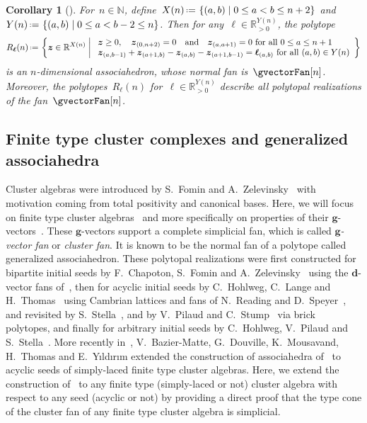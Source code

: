\documentclass{amsart}
\newtheorem{corollary}[theorem]{Corollary}
\theoremstyle{definition}
\newcommand{\R}{\mathbb{R}} %
\newcommand{\N}{\mathbb{N}} %
\renewcommand{\b}[1]{{\boldsymbol{#1}}} %
\newcommand{\set}[2]{\left\{ #1 \;\middle|\; #2 \right\}} %
\newcommand{\eqdef}{\mbox{\,\raisebox{0.2ex}{\scriptsize\ensuremath{\mathrm:}}\ensuremath{=}\,}} %
\newcommand{\darkblue}{\color{darkblue}} %
\newcommand{\defn}[1]{\textsl{\darkblue #1}} %
\newcommand{\vincent}[1]{\todo[color=blue!30]{#1 \\ \hfill --- V.}}
\begin{document}
\begin{corollary}[{\cite[Sect.~3.2]{ArkaniHamedBaiHeYan}}]
\label{coro:allPolytopalRealizationsAsso}
For~$n \in \N$, define~$X(n) \eqdef \set{(a,b)}{0 \le a < b \le n+2}$ and~$Y(n) \eqdef \set{(a,b)}{0 \le a < b-2 \le n}$.
Then for any~$\b{\ell} \in \R_{>0}^{Y(n)}$, the polytope
\[
R_\b{\ell}(n) \eqdef \set{\b{z} \in \R^{X(n)}}{\begin{array}{l} \b{z} \ge 0, \quad \b{z}_{(0,n+2)} = 0 \quad\text{and}\quad \b{z}_{(a,a+1)} = 0 \text{ for all } 0 \le a \le n+1 \\ \b{z}_{(a,b-1)} + \b{z}_{(a+1,b)} - \b{z}_{(a,b)} - \b{z}_{(a+1,b-1)} = \b{\ell}_{(a,b)} \text{ for all } (a,b) \in Y(n) \end{array}}
\]
is an $n$-dimensional associahedron, whose normal fan is~$\gvectorFan[n]$.
Moreover, the polytopes~$R_\b{\ell}(n)$ for~$\b{\ell} \in \R_{>0}^{Y(n)}$ describe all polytopal realizations of the fan~$\gvectorFan[n]$.
\end{corollary}



\subsection{Finite type cluster complexes and generalized associahedra}
\label{subsec:typeConeCA}

Cluster algebras were introduced by S.~Fomin and A.~Zelevinsky~\cite{FominZelevinsky-ClusterAlgebrasI} with motivation coming from total positivity and canonical bases.
Here, we will focus on finite type cluster algebras~\cite{FominZelevinsky-ClusterAlgebrasII} and more specifically on properties of their $\b{g}$-vectors~\cite{FominZelevinsky-ClusterAlgebrasIV}.
These $\b{g}$-vectors support a complete simplicial fan, which is called \defn{$\b{g}$-vector fan} or \defn{cluster fan}. It is known to be the normal fan of a polytope called generalized associahedron. These polytopal realizations were first constructed for bipartite initial seeds by F.~Chapoton, S.~Fomin and A.~Zelevinsky~\cite{ChapotonFominZelevinsky} using the $\b{d}$-vector fans of~\cite{FominZelevinsky-YSystems}, then for acyclic initial seeds by C.~Hohlweg, C.~Lange and H.~Thomas~\cite{HohlwegLangeThomas} using Cambrian lattices and fans of N.~Reading and D.~Speyer~\cite{Reading-CambrianLattices, ReadingSpeyer}, and revisited by S.~Stella~\cite{Stella}, and by V.~Pilaud and C.~Stump~\cite{PilaudStump-brickPolytope} via brick polytopes, and finally for arbitrary initial seeds by C.~Hohlweg, V.~Pilaud and S.~Stella~\cite{HohlwegPilaudStella}.
More recently in~\cite{BazierMatteDouvilleMousavandThomasYildirim}, V.~Bazier-Matte, G.~Douville, K.~Mousavand, H.~Thomas and E.~Y\i ld\i r\i m extended the construction of associahedra of~\cite[Sect.~3.2]{ArkaniHamedBaiHeYan} to acyclic seeds of simply-laced finite type cluster algebras.
Here, we extend the construction of~\cite[Sect.~3.2]{ArkaniHamedBaiHeYan} to any finite type (simply-laced or not) cluster algebra with respect to any seed (acyclic or not) by providing a direct proof that the type cone of the cluster fan of any finite type cluster algebra is simplicial.
\end{document}
